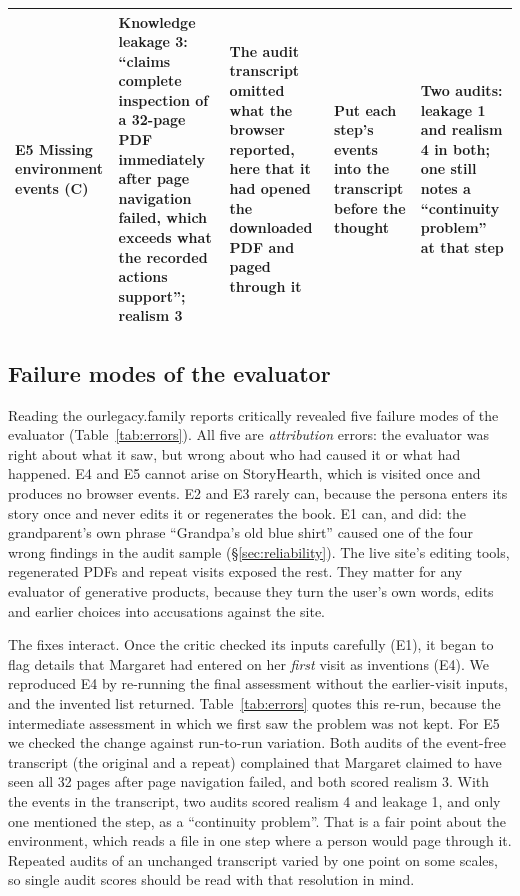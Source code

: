 \documentclass[10pt,twocolumn]{article}
\newcommand{\site}{StoryHearth}
\newcommand{\ol}{\textsf{ourlegacy.family}}
\begin{document}
\begin{table}[t]
\begin{tabularx}{\textwidth}{@{}P{2.1cm}YYP{3.6cm}Y@{}}
\addlinespace
E5 Missing environment events (C) & Knowledge leakage 3: ``claims complete inspection of a 32-page PDF immediately after page navigation failed, which exceeds what the recorded actions support''; realism 3 & The audit transcript omitted what the browser reported, here that it had opened the downloaded PDF and paged through it & Put each step's events into the transcript before the thought & Two audits: leakage 1 and realism 4 in both; one still notes a ``continuity problem'' at that step \\
\bottomrule
\end{tabularx}
\end{table}

\subsection{Failure modes of the evaluator}
\label{sec:errors}

Reading the \ol{} reports critically revealed five failure modes of the evaluator (Table~\ref{tab:errors}). All five are \emph{attribution} errors: the evaluator was right about what it saw, but wrong about who had caused it or what had happened. E4 and E5 cannot arise on \site{}, which is visited once and produces no browser events. E2 and E3 rarely can, because the persona enters its story once and never edits it or regenerates the book. E1 can, and did: the grandparent's own phrase ``Grandpa's old blue shirt'' caused one of the four wrong findings in the audit sample (\S\ref{sec:reliability}). The live site's editing tools, regenerated PDFs and repeat visits exposed the rest. They matter for any evaluator of generative products, because they turn the user's own words, edits and earlier choices into accusations against the site.

The fixes interact. Once the critic checked its inputs carefully (E1), it began to flag details that Margaret had entered on her \emph{first} visit as inventions (E4). We reproduced E4 by re-running the final assessment without the earlier-visit inputs, and the invented list returned. Table~\ref{tab:errors} quotes this re-run, because the intermediate assessment in which we first saw the problem was not kept. For E5 we checked the change against run-to-run variation. Both audits of the event-free transcript (the original and a repeat) complained that Margaret claimed to have seen all 32 pages after page navigation failed, and both scored realism 3. With the events in the transcript, two audits scored realism 4 and leakage 1, and only one mentioned the step, as a ``continuity problem''. That is a fair point about the environment, which reads a file in one step where a person would page through it. Repeated audits of an unchanged transcript varied by one point on some scales, so single audit scores should be read with that resolution in mind.
\end{document}

